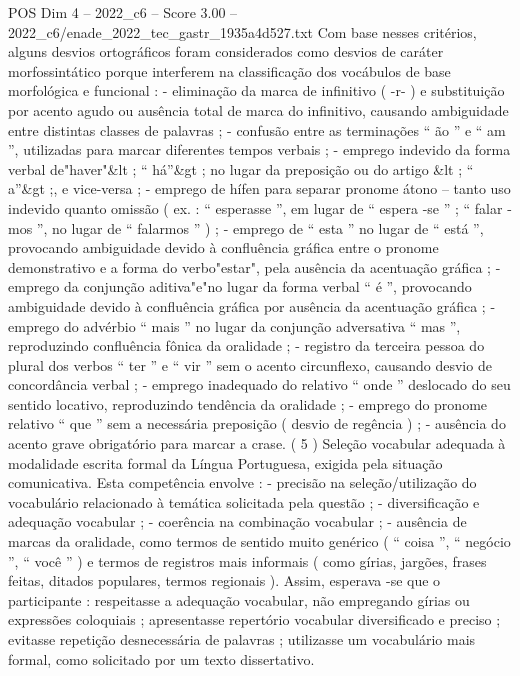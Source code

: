 \begin{textsample}{POS Dim 4 – 2022\_c6 – Score 3.00 – 2022\_c6/enade\_2022\_tec\_gastr\_1935a4d527.txt}
Com base nesses critérios, alguns desvios ortográficos foram considerados como desvios de caráter morfossintático porque interferem na classificação dos vocábulos de base morfológica e funcional : - eliminação da marca de infinitivo ( -r- ) e substituição por acento agudo ou ausência total de marca do infinitivo, causando ambiguidade entre distintas classes de palavras ; - confusão entre as terminações “ ão ” e “ am ”, utilizadas para marcar diferentes tempos verbais ; - emprego indevido da forma verbal de"haver"\&lt ; “ há”\&gt ; no lugar da preposição ou do artigo \&lt ; “ a”\&gt ;, e vice-versa ; - emprego de hífen para separar pronome átono – tanto uso indevido quanto omissão ( ex. : “ esperasse ”, em lugar de “ espera -se ” ; “ falar -mos ”, no lugar de “ falarmos ” ) ; - emprego de “ esta ” no lugar de “ está ”, provocando ambiguidade devido à confluência gráfica entre o pronome demonstrativo e a forma do verbo"estar", pela ausência da acentuação gráfica ; - emprego da conjunção aditiva"e"no lugar da forma verbal “ é ”, provocando ambiguidade devido à confluência gráfica por ausência da acentuação gráfica ; - emprego do advérbio “ mais ” no lugar da conjunção adversativa “ mas ”, reproduzindo confluência fônica da oralidade ; - registro da terceira pessoa do plural dos verbos “ ter ” e “ vir ” sem o acento circunflexo, causando desvio de concordância verbal ; - emprego inadequado do relativo “ onde ” deslocado do seu sentido locativo, reproduzindo tendência da oralidade ; - emprego do pronome relativo “ que ” sem a necessária preposição ( desvio de regência ) ; - ausência do acento grave obrigatório para marcar a crase. ( 5 ) Seleção vocabular adequada à modalidade escrita formal da Língua Portuguesa, exigida pela situação comunicativa.
Esta competência envolve : - precisão na seleção/utilização do vocabulário relacionado à temática solicitada pela questão ; - diversificação e adequação vocabular ; - coerência na combinação vocabular ; - ausência de marcas da oralidade, como termos de sentido muito genérico ( “ coisa ”, “ negócio ”, “ você ” ) e termos de registros mais informais ( como gírias, jargões, frases feitas, ditados populares, termos regionais ).
Assim, esperava -se que o participante : respeitasse a adequação vocabular, não empregando gírias ou expressões coloquiais ; apresentasse repertório vocabular diversificado e preciso ; evitasse repetição desnecessária de palavras ; utilizasse um vocabulário mais formal, como solicitado por um texto dissertativo.

\end{textsample}
